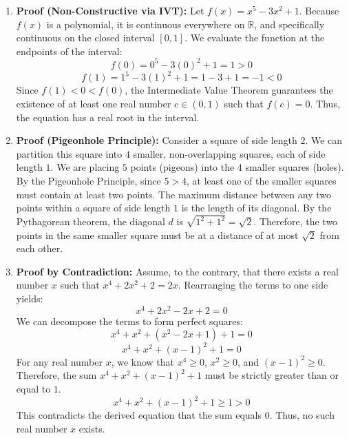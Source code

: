 \documentclass[11pt]{article}
\begin{document}
\begin{enumerate}
    \item \textbf{Proof (Non-Constructive via IVT):} Let $f(x) = x^5 - 3x^2 + 1$. Because $f(x)$ is a polynomial, it is continuous everywhere on $\mathbb{R}$, and specifically continuous on the closed interval $[0, 1]$. 
    We evaluate the function at the endpoints of the interval:
    \[ f(0) = 0^5 - 3(0)^2 + 1 = 1 > 0 \]
    \[ f(1) = 1^5 - 3(1)^2 + 1 = 1 - 3 + 1 = -1 < 0 \]
    Since $f(1) < 0 < f(0)$, the Intermediate Value Theorem guarantees the existence of at least one real number $c \in (0, 1)$ such that $f(c) = 0$. Thus, the equation has a real root in the interval. \qedhere

    \item \textbf{Proof (Pigeonhole Principle):} Consider a square of side length $2$. We can partition this square into $4$ smaller, non-overlapping squares, each of side length $1$. 
    We are placing $5$ points (pigeons) into the $4$ smaller squares (holes). By the Pigeonhole Principle, since $5 > 4$, at least one of the smaller squares must contain at least two points.
    The maximum distance between any two points within a square of side length $1$ is the length of its diagonal. By the Pythagorean theorem, the diagonal $d$ is $\sqrt{1^2 + 1^2} = \sqrt{2}$. Therefore, the two points in the same smaller square must be at a distance of at most $\sqrt{2}$ from each other. \qedhere

    \item \textbf{Proof by Contradiction:} Assume, to the contrary, that there exists a real number $x$ such that $x^4 + 2x^2 + 2 = 2x$. Rearranging the terms to one side yields:
    \[ x^4 + 2x^2 - 2x + 2 = 0 \]
    We can decompose the terms to form perfect squares:
    \[ x^4 + x^2 + (x^2 - 2x + 1) + 1 = 0 \]
    \[ x^4 + x^2 + (x - 1)^2 + 1 = 0 \]
    For any real number $x$, we know that $x^4 \ge 0$, $x^2 \ge 0$, and $(x - 1)^2 \ge 0$. Therefore, the sum $x^4 + x^2 + (x - 1)^2 + 1$ must be strictly greater than or equal to $1$. 
    \[ x^4 + x^2 + (x - 1)^2 + 1 \ge 1 > 0 \]
    This contradicts the derived equation that the sum equals $0$. Thus, no such real number $x$ exists. \qedhere


\end{enumerate}
\end{document}
